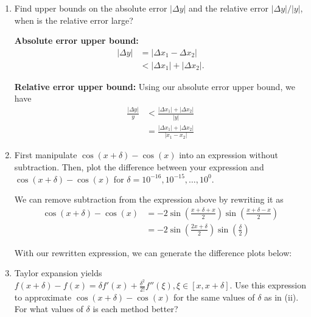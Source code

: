 \documentclass[a4paper,10pt]{article}
\newcommand{\abs}[1]{\left| #1 \right|}
\begin{document}
\begin{enumerate}[label = \arabic*.)]
            \begin{enumerate}[label = \roman*.]
                \item Find upper bounds on the absolute error $\abs{\Delta y}$ and the relative error $\abs{\Delta y} / \abs{y}$, when is the relative error large?
                
                \textbf{Absolute error upper bound:}
                \begin{align*}
                    \abs{\Delta y} &= \abs{\Delta x_1 - \Delta x_2} \\
                    &< \abs{\Delta x_1} + \abs{\Delta x_2}.
                \end{align*}
                
                \textbf{Relative error upper bound:} Using our absolute error upper bound, we have
                \begin{align*}
                    \frac{\abs{\Delta y}}{y} &< \frac{\abs{\Delta x_1} + \abs{\Delta x_2}}{\abs{y}} \\
                    &= \frac{\abs{\Delta x_1} + \abs{\Delta x_2}}{\abs{x_1 - x_2}}
                \end{align*}
                
                \item First manipulate $\cos(x + \delta) - \cos(x)$ into an expression without subtraction. Then, plot the difference between your expression and $\cos(x + \delta) - \cos(x)$ for $\delta = 10^{-16}, 10^{-15}, \ldots, 10^{0}$.
                
                We can remove subtraction from the expression above by rewriting it as
                \begin{align*}
                    \cos(x + \delta) - \cos(x) &= -2\sin\left(\frac{x + \delta + x}{2}\right)\sin\left(\frac{x + \delta - x}{2}\right) \\
                    &= -2\sin\left(\frac{2x + \delta}{2}\right) \sin\left(\frac{\delta}{2}\right)
                \end{align*}
                
                With our rewritten expression, we can generate the difference plots below:
                
                \item Taylor expansion yields $f(x + \delta) - f(x) = \delta f'(x) + \frac{\delta^2}{2!}f''(\xi), \xi \in [x, x+\delta].$ Use this expression to approximate $\cos(x + \delta) - \cos(x)$  for the same values of $\delta$ as in (ii). For what values of $\delta$ is each method better?
            \end{enumerate}
            

\end{enumerate}
\end{document}
